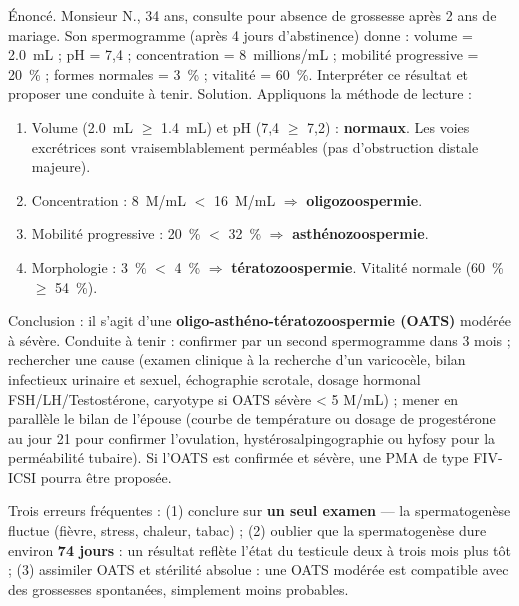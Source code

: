 \documentclass[11pt]{article}
\begin{document}
\begin{exoresolu}
Énoncé. Monsieur N., 34 ans, consulte pour absence de grossesse après 2 ans de mariage. Son spermogramme (après 4 jours d'abstinence) donne : volume = \SI{2,0}{mL} ; pH = 7,4 ; concentration = \SI{8}{millions/mL} ; mobilité progressive = \SI{20}{\%} ; formes normales = \SI{3}{\%} ; vitalité = \SI{60}{\%}. Interpréter ce résultat et proposer une conduite à tenir.
\tcblower
Solution. Appliquons la méthode de lecture :
\begin{enumerate}
\item Volume (\SI{2,0}{mL} $\geq$ \SI{1,4}{mL}) et pH (7,4 $\geq$ 7,2) : \textbf{normaux}. Les voies excrétrices sont vraisemblablement perméables (pas d'obstruction distale majeure).
\item Concentration : \SI{8}{M/mL} $<$ \SI{16}{M/mL} $\Rightarrow$ \textbf{oligozoospermie}.
\item Mobilité progressive : \SI{20}{\%} $<$ \SI{32}{\%} $\Rightarrow$ \textbf{asthénozoospermie}.
\item Morphologie : \SI{3}{\%} $<$ \SI{4}{\%} $\Rightarrow$ \textbf{tératozoospermie}. Vitalité normale (\SI{60}{\%} $\geq$ \SI{54}{\%}).
\end{enumerate}
Conclusion : il s'agit d'une \textbf{oligo-asthéno-tératozoospermie (OATS)} modérée à sévère. Conduite à tenir : confirmer par un second spermogramme dans 3 mois ; rechercher une cause (examen clinique à la recherche d'un varicocèle, bilan infectieux urinaire et sexuel, échographie scrotale, dosage hormonal FSH/LH/Testostérone, caryotype si OATS sévère < 5 M/mL) ; mener en parallèle le bilan de l'épouse (courbe de température ou dosage de progestérone au jour 21 pour confirmer l'ovulation, hystérosalpingographie ou hyfosy pour la perméabilité tubaire). Si l'OATS est confirmée et sévère, une PMA de type FIV-ICSI pourra être proposée.
\end{exoresolu}

\begin{attention}
Trois erreurs fréquentes : (1) conclure sur \textbf{un seul examen} — la spermatogenèse fluctue (fièvre, stress, chaleur, tabac) ; (2) oublier que la spermatogenèse dure environ \textbf{74 jours} : un résultat reflète l'état du testicule deux à trois mois plus tôt ; (3) assimiler OATS et stérilité absolue : une OATS modérée est compatible avec des grossesses spontanées, simplement moins probables.
\end{attention}
\end{document}
